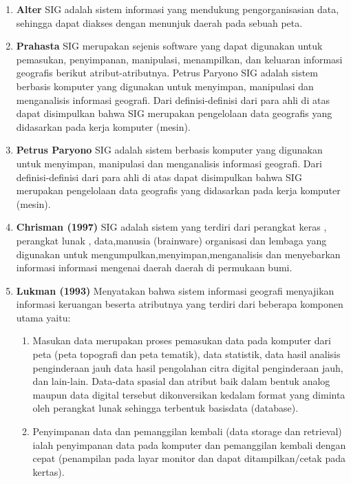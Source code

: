 \begin{enumerate}
\item \textbf{Alter}
\subitem SIG adalah sistem informasi yang mendukung pengorganisasian data, sehingga dapat diakses dengan menunjuk daerah pada sebuah peta.

\item \textbf{Prahasta}
\subitem SIG merupakan sejenis software yang dapat digunakan untuk pemasukan, penyimpanan, manipulasi, menampilkan, dan keluaran informasi geografis berikut atribut-atributnya.  Petrus Paryono SIG adalah sistem berbasis komputer yang digunakan untuk menyimpan, manipulasi dan menganalisis informasi geografi. Dari definisi-definisi dari para ahli di atas dapat disimpulkan bahwa SIG merupakan pengelolaan data geografis yang didasarkan pada kerja komputer (mesin).

\item \textbf{Petrus Paryono}
\subitem SIG adalah sistem berbasis komputer yang digunakan untuk menyimpan, manipulasi dan menganalisis informasi geografi. Dari definisi-definisi dari para ahli di atas dapat disimpulkan bahwa SIG merupakan pengelolaan data geografis yang didasarkan pada kerja komputer (mesin).

\item \textbf{Chrisman (1997)}
\subitem SIG adalah sistem yang terdiri dari perangkat keras , perangkat lunak , data,manusia (brainware) organisasi dan lembaga yang digunakan untuk mengumpulkan,menyimpan,menganalisis dan menyebarkan informasi informasi mengenai daerah daerah di permukaan bumi.

\item \textbf{Lukman (1993)}
\subitem Menyatakan bahwa sistem informasi geografi menyajikan informasi keruangan beserta atributnya yang terdiri dari beberapa komponen utama yaitu:
\begin{enumerate}
\item Masukan data merupakan proses pemasukan data pada komputer dari peta (peta topografi dan peta tematik), data statistik, data hasil analisis penginderaan jauh data hasil pengolahan citra digital penginderaan jauh, dan lain-lain. Data-data spasial dan atribut baik dalam bentuk analog maupun data digital tersebut dikonversikan kedalam format yang diminta oleh perangkat lunak sehingga terbentuk basisdata (database).
\item Penyimpanan data dan pemanggilan kembali (data storage dan retrieval) ialah penyimpanan data pada komputer dan pemanggilan kembali dengan cepat (penampilan pada layar monitor dan dapat ditampilkan/cetak pada kertas).


\end{enumerate}
\end{enumerate}
